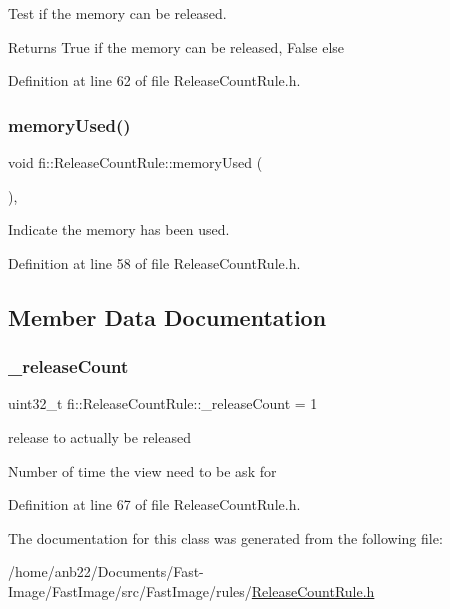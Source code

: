 Test if the memory can be released. 

\begin{DoxyReturn}{Returns}
True if the memory can be released, False else 
\end{DoxyReturn}


Definition at line 62 of file Release\+Count\+Rule.\+h.

\mbox{\label{classfi_1_1ReleaseCountRule_a0e452931ebff91183524aa5cfc339485}} 
\subsubsection{\texorpdfstring{memory\+Used()}{memoryUsed()}}
{\footnotesize\ttfamily void fi\+::\+Release\+Count\+Rule\+::memory\+Used (\begin{DoxyParamCaption}{ }\end{DoxyParamCaption})\hspace{0.3cm}{\ttfamily [inline]}, {\ttfamily [override]}}



Indicate the memory has been used. 



Definition at line 58 of file Release\+Count\+Rule.\+h.



\subsection{Member Data Documentation}
\mbox{\label{classfi_1_1ReleaseCountRule_adae4400daea0e3ca57a2e355bbc78046}} 
\subsubsection{\texorpdfstring{\+\_\+release\+Count}{\_releaseCount}}
{\footnotesize\ttfamily uint32\+\_\+t fi\+::\+Release\+Count\+Rule\+::\+\_\+release\+Count = 1\hspace{0.3cm}{\ttfamily [private]}}



release to actually be released 

Number of time the view need to be ask for 

Definition at line 67 of file Release\+Count\+Rule.\+h.



The documentation for this class was generated from the following file\+:\begin{DoxyCompactItemize}
\item 
/home/anb22/\+Documents/\+Fast-\/\+Image/\+Fast\+Image/src/\+Fast\+Image/rules/\hyperlink{ReleaseCountRule_8h}{Release\+Count\+Rule.\+h}\end{DoxyCompactItemize}

